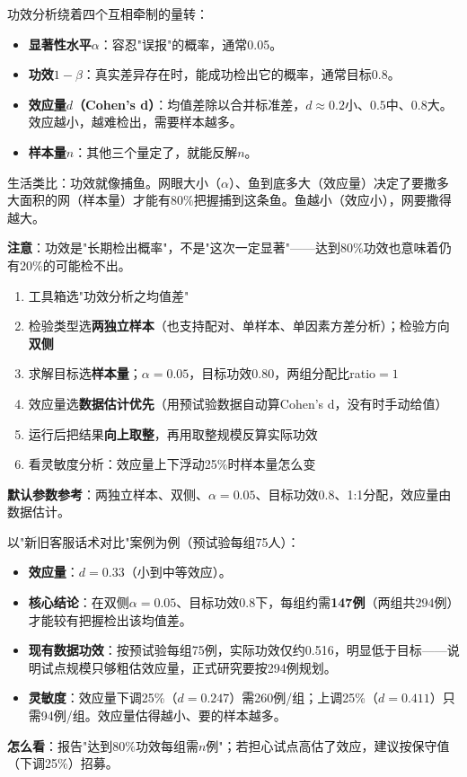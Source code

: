 \begin{algoprinciple}
功效分析绕着四个互相牵制的量转：

\begin{itemize}
    \item \textbf{显著性水平$\alpha$}：容忍"误报"的概率，通常0.05。
    \item \textbf{功效$1-\beta$}：真实差异存在时，能成功检出它的概率，通常目标0.8。
    \item \textbf{效应量$d$（Cohen's d）}：均值差除以合并标准差，$d\approx0.2$小、$0.5$中、$0.8$大。效应越小，越难检出，需要样本越多。
    \item \textbf{样本量$n$}：其他三个量定了，就能反解$n$。
\end{itemize}

生活类比：功效就像捕鱼。网眼大小（$\alpha$）、鱼到底多大（效应量）决定了要撒多大面积的网（样本量）才能有80\%把握捕到这条鱼。鱼越小（效应小），网要撒得越大。

\textbf{注意}：功效是"长期检出概率"，不是"这次一定显著"——达到80\%功效也意味着仍有20\%的可能检不出。
\end{algoprinciple}

\begin{algosposs}
\begin{enumerate}
    \item 工具箱选"功效分析之均值差"
    \item 检验类型选\textbf{两独立样本}（也支持配对、单样本、单因素方差分析）；检验方向\textbf{双侧}
    \item 求解目标选\textbf{样本量}；$\alpha=0.05$，目标功效$0.80$，两组分配比ratio$=1$
    \item 效应量选\textbf{数据估计优先}（用预试验数据自动算Cohen's d，没有时手动给值）
    \item 运行后把结果\textbf{向上取整}，再用取整规模反算实际功效
    \item 看灵敏度分析：效应量上下浮动25\%时样本量怎么变
\end{enumerate}

\textbf{默认参数参考}：两独立样本、双侧、$\alpha=0.05$、目标功效0.8、1:1分配，效应量由数据估计。
\end{algosposs}

\begin{algoresult}
以"新旧客服话术对比"案例为例（预试验每组75人）：

\begin{itemize}
    \item \textbf{效应量}：$d=0.33$（小到中等效应）。
    \item \textbf{核心结论}：在双侧$\alpha=0.05$、目标功效0.8下，每组约需\textbf{147例}（两组共294例）才能较有把握检出该均值差。
    \item \textbf{现有数据功效}：按预试验每组75例，实际功效仅约0.516，明显低于目标——说明试点规模只够粗估效应量，正式研究要按294例规划。
    \item \textbf{灵敏度}：效应量下调25\%（$d=0.247$）需260例/组；上调25\%（$d=0.411$）只需94例/组。效应量估得越小、要的样本越多。
\end{itemize}

\textbf{怎么看}：报告"达到80\%功效每组需$n$例"；若担心试点高估了效应，建议按保守值（下调25\%）招募。
\end{algoresult}

